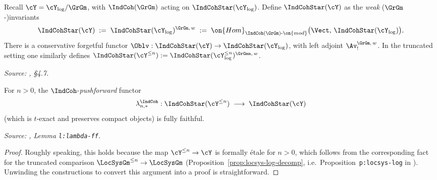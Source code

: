 \begin{definition}
  \label{def:indcoh-star-Y}
  Recall $\cY = \cY_{\log}/\GrGm$, with $\IndCoh(\GrGm)$ acting on
  $\IndCohStar(\cY_{\log})$. Define $\IndCohStar(\cY)$ as the \emph{weak}
  ($\GrGm$-)invariants
  \[
    \IndCohStar(\cY) \;:=\; \IndCohStar(\cY_{\log})^{\GrGm,\, w}
    \;:=\; \on{Hom}_{\IndCoh(\GrGm)\text{-}\on{mod}}
           \big(\Vect,\, \IndCohStar(\cY_{\log})\big).
  \]
  There is a conservative forgetful functor
  $\Oblv : \IndCohStar(\cY) \to \IndCohStar(\cY_{\log})$, with left adjoint
  $\Av_!^{\GrGm,\, w}$. In the truncated setting one similarly defines
  $\IndCohStar(\cY^{\leq n}) := \IndCohStar(\cY_{\log}^{\leq n})^{\GrGmn,\, w}$.

  \textit{Source: \cite{hilburn-raskin}, \S4.7.}
\end{definition}

\begin{lemma}
  \label{lem:lambda-n-ff}
  For $n > 0$, the $\IndCoh$-\emph{pushforward} functor
  \[
    \lambda_{n,*}^{\IndCoh} : \IndCohStar(\cY^{\leq n})
    \;\longrightarrow\; \IndCohStar(\cY)
  \]
  (which is $t$-exact and preserves compact objects) is fully faithful.

  \textit{Source: \cite{hilburn-raskin}, Lemma \texttt{l:lambda-ff}.}
\end{lemma}

\begin{proof}
  Roughly speaking, this holds because the map $\cY^{\leq n} \to \cY$ is
  formally \'etale for $n > 0$, which follows from the corresponding fact
  for the truncated comparison $\LocSysGm^{\leq n} \to \LocSysGm$
  (Proposition~\ref{prop:locsys-log-decomp}, i.e.\ Proposition~\texttt{p:locsys-log}
  in \cite{hilburn-raskin}). Unwinding the constructions to convert this
  argument into a proof is straightforward.
\end{proof}

